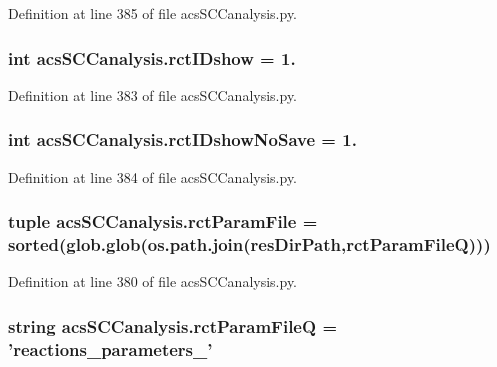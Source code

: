 Definition at line 385 of file acs\-S\-C\-Canalysis.\-py.

\hypertarget{a00096_a8a780c7762bc8a40f296abfd474b7ce4}{
\subsubsection[{rct\-I\-Dshow}]{\setlength{\rightskip}{0pt plus 5cm}int acs\-S\-C\-Canalysis.\-rct\-I\-Dshow = 1.}}\label{a00096_a8a780c7762bc8a40f296abfd474b7ce4}


Definition at line 383 of file acs\-S\-C\-Canalysis.\-py.

\hypertarget{a00096_a3942b0b71d5893c244f7f49929db336b}{
\subsubsection[{rct\-I\-Dshow\-No\-Save}]{\setlength{\rightskip}{0pt plus 5cm}int acs\-S\-C\-Canalysis.\-rct\-I\-Dshow\-No\-Save = 1.}}\label{a00096_a3942b0b71d5893c244f7f49929db336b}


Definition at line 384 of file acs\-S\-C\-Canalysis.\-py.

\hypertarget{a00096_ac700504fc38d7684ec9fae104d7d90a3}{
\subsubsection[{rct\-Param\-File}]{\setlength{\rightskip}{0pt plus 5cm}tuple acs\-S\-C\-Canalysis.\-rct\-Param\-File = sorted(glob.\-glob(os.\-path.\-join({\bf res\-Dir\-Path},{\bf rct\-Param\-File\-Q})))}}\label{a00096_ac700504fc38d7684ec9fae104d7d90a3}


Definition at line 380 of file acs\-S\-C\-Canalysis.\-py.

\hypertarget{a00096_aff5ea475bb2c78122a231a915dc88e89}{
\subsubsection[{rct\-Param\-File\-Q}]{\setlength{\rightskip}{0pt plus 5cm}string acs\-S\-C\-Canalysis.\-rct\-Param\-File\-Q = 'reactions\-\_\-parameters\-\_\-'}}\label{a00096_aff5ea475bb2c78122a231a915dc88e89}


